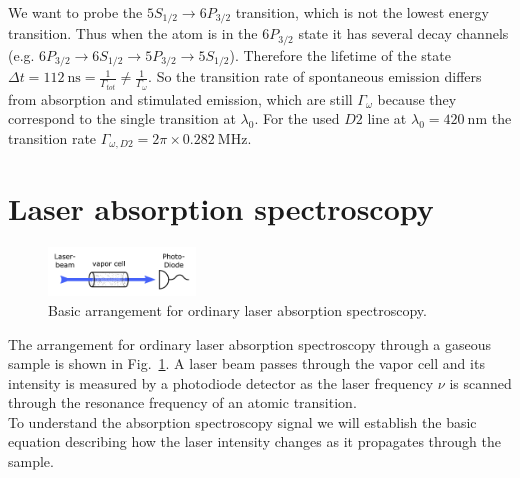 We want to probe the \(5S_{1/2}\rightarrow 6P_{3/2}\) transition, which is not
the lowest energy transition. Thus when the atom is in the \(6P_{3/2} \) state
it has several decay channels 
(e.g. \(6P_{3/2}\rightarrow 6S_{1/2} \rightarrow 5P_{3/2} \rightarrow 5S_{1/2}\)). 
Therefore the lifetime of the state 
\(\Delta t=\SI{112}{\nano\second}=\frac{1}{\Gamma_{tot}}\neq\frac{1}{\Gamma_{\omega}} \).
So the transition rate of spontaneous emission differs from absorption 
and stimulated emission, which are still \(\Gamma_\omega \) because they correspond
to the single transition at \(\lambda_0\). For the used \(D2 \) line at
\(\lambda_0 = \SI{420}{\nano\meter}\) the transition rate  
\(\Gamma_{\omega,D2} = 2\pi\times\SI{0.282}{\mega\hertz} \).


\section{Laser absorption spectroscopy}   %

\begin{figure}
    \centering
    \includegraphics[width=0.35\textwidth]{absorption_spectroscopy_theory}    
    \caption{\label{fig:absorption_spectroscopy} Basic arrangement for ordinary 
        laser absorption spectroscopy.}
\end{figure}

The arrangement for ordinary laser absorption spectroscopy through a gaseous sample 
is shown in Fig.~\ref{fig:absorption_spectroscopy}. A laser beam passes through 
the vapor cell and its intensity is measured by a photodiode detector as the laser 
frequency \(\nu \) is scanned through the resonance frequency of an atomic transition. \\
To understand the absorption spectroscopy signal we will establish the basic 
equation describing how the laser intensity changes as it propagates through the 
sample. 
\pagebreak

